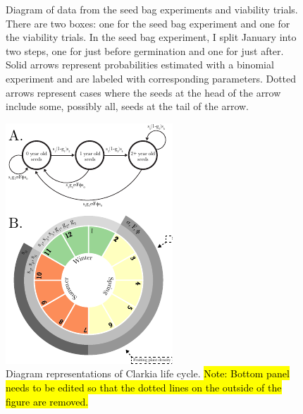 \documentclass[12pt, oneside, titlepage]{article}   	%
\begin{document}
{\begin{figure}[!htbp]
\begin{tikzpicture}
  \end{tikzpicture}
  \caption{Diagram of data from the seed bag experiments and viability trials. There are two boxes: one for the seed bag experiment and one for the viability trials. In the seed bag experiment, I split January into two steps, one for just before germination and one for just after. Solid arrows represent probabilities estimated with a binomial experiment and are labeled with corresponding parameters. Dotted arrows represent cases where the seeds at the head of the arrow include some, possibly all, seeds at the tail of the arrow.}\label{seedexperiments}
 \label{fig:seedBagDiagram}
\end{figure}

\begin{figure}[h]
   \centering
       \includegraphics[scale=2]{../manuscript/figures/model-figure.pdf}  
        \caption{ Diagram representations of Clarkia life cycle. \hl{Note: Bottom panel needs to be edited so that the dotted lines on the outside of the figure are removed.} }
        \label{fig:life-cycle}
\end{figure}


\fi

}
\end{document}
